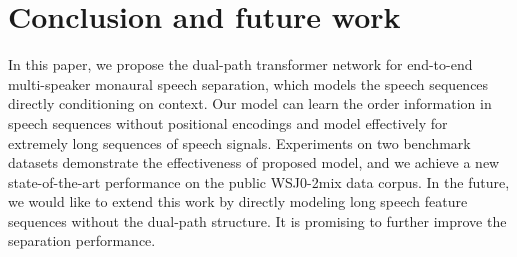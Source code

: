 \documentclass[a4paper]{article}
\begin{document}
\section{Conclusion and future work}

In this paper, we propose the dual-path transformer network for end-to-end multi-speaker monaural speech separation, which models the speech sequences directly conditioning on context. Our model can learn the order information in speech sequences without positional encodings and model effectively for extremely long sequences of speech signals. Experiments on two benchmark datasets demonstrate the effectiveness of proposed model, and we achieve a new state-of-the-art performance on the public WSJ0-2mix data corpus. In the future, we would like to extend this work by directly modeling long speech feature sequences without the dual-path structure. It is promising to further improve the separation performance.




\end{document}
